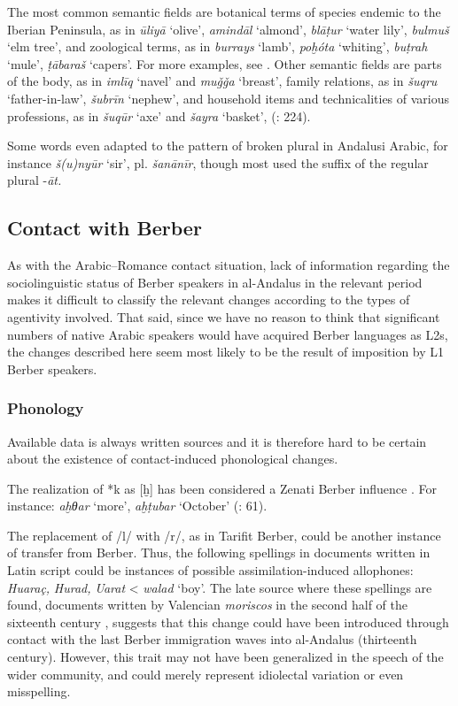 \documentclass[output=paper,modfonts,nonflat]{langsci/langscibook}
\begin{document}
The most common semantic fields are botanical terms of species endemic to the Iberian Peninsula, as in \textit{ūliyā} ‘olive’, \textit{amindāl} ‘almond’, \textit{blāṭur} ‘water lily’, \textit{bulmuš} ‘elm tree’, and zoological terms, as in \textit{burrays} ‘lamb’, \textit{poḫóta} ‘whiting’, \textit{buṭrah} ‘mule’, \textit{ṭābaraš} ‘capers’. For more examples, see \citet{CorrientePereiraVicente2017}. Other semantic fields are parts of the body, as in \textit{imlīq}  ‘navel’ and \textit{muǧǧa} ‘breast’, family relations, as in \textit{šuqru} ‘father-in-law’, \textit{šubrīn} ‘nephew’, and household items and technicalities of various professions, as in \textit{šuqūr} ‘axe’ and \textit{šayra} ‘basket’, (\citealt{CorrientePereiraVicente2015}: 224). 

Some words even adapted to the pattern of broken plural in Andalusi Arabic, for instance \textit{š(u)nyūr} ‘sir’, pl. \textit{šanānīr}, though most used the suffix of the regular plural -\textit{āt.}

\subsection{Contact with Berber}

As with the Arabic–Romance contact situation, lack of information regarding the sociolinguistic status of Berber speakers in al-Andalus in the relevant period makes it difficult to classify the relevant changes according to the types of agentivity involved. That said, since we have no reason to think that significant numbers of native Arabic speakers would have acquired Berber languages as L2s, the changes described here seem most likely to be the result of imposition by L1 Berber speakers.

\subsubsection{Phonology}

Available data is always written sources and it is therefore hard to be certain about the existence of contact-induced phonological changes. 

The realization of *k as [ḫ] has been considered a Zenati Berber influence \citep[7]{Corriente1981}. For instance: \textit{aḫθar} ‘more’, \textit{aḫṭubar} ‘October’ (\citealt{CorrientePereiraVicente2015}: 61).  

The replacement of /l/ with /r/, as in Tarifit Berber, could be another instance of transfer from Berber. Thus, the following spellings in documents written in Latin script could be instances of possible assimilation-induced allophones: \textit{Huaraç,} \textit{Hurad,} \textit{Uarat} < \textit{walad} ‘boy’. The late source where these spellings are found, documents written by Valencian \textit{moriscos} in the second half of the sixteenth century \citep{Labarta1987}, suggests that this change could have been introduced through contact with the last Berber immigration waves into al-Andalus (thirteenth century). However, this trait may not have been generalized in the speech of the wider community, and could merely represent idiolectal variation or even misspelling. 
\end{document}
